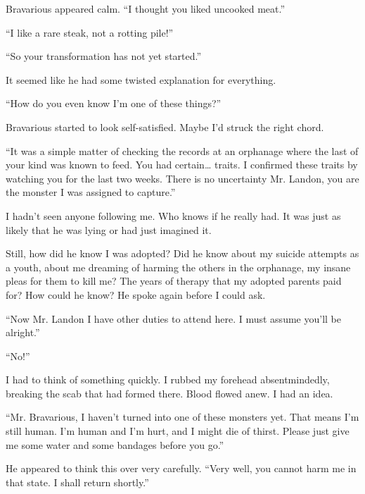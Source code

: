 Bravarious appeared calm. ``I thought you liked uncooked
meat.''



``I like a rare steak, not a rotting pile!''



``So your transformation has not yet started.''



It seemed like he had some twisted explanation for
everything.



``How do you even know I'm one of these
things?''



Bravarious started to look self-satisfied. Maybe I'd struck
the right chord.



``It was a simple matter of checking the records at an
orphanage where the last of your kind was known to feed. You had
certain{\ldots} traits. I confirmed these traits by watching you
for the last two weeks. There is no uncertainty Mr. Landon, you are
the monster I was assigned to capture.''



I hadn't seen anyone following me. Who knows if he really
had. It was just as likely that he was lying or had just imagined
it.



Still, how did he know I was adopted? Did he know about my suicide
attempts as a youth, about me dreaming of harming the others in the
orphanage, my insane pleas for them to kill me? The years of
therapy that my adopted parents paid for? How could he know? He
spoke again before I could ask.



``Now Mr. Landon I have other duties to attend here. I must
assume you'll be alright.''



``No!''



I had to think of something quickly. I rubbed my forehead
absentmindedly, breaking the scab that had formed there. Blood
flowed anew. I had an idea.



``Mr. Bravarious, I haven't turned into one of these
monsters yet. That means I'm still human. I'm human and
I'm hurt, and I might die of thirst. Please just give me some
water and some bandages before you go.''



He appeared to think this over very carefully. ``Very well,
you cannot harm me in that state. I shall return
shortly.''



